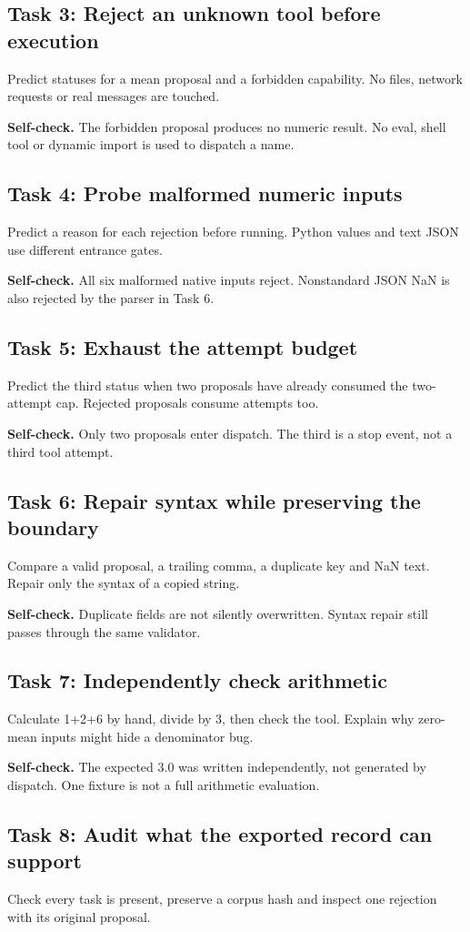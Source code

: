 \subsection{Task 3: Reject an unknown tool before execution}
Predict statuses for a mean proposal and a forbidden capability. No files, network requests or real messages are touched.

\textbf{Self-check.} The forbidden proposal produces no numeric result. No eval, shell tool or dynamic import is used to dispatch a name.
\subsection{Task 4: Probe malformed numeric inputs}
Predict a reason for each rejection before running. Python values and text JSON use different entrance gates.

\textbf{Self-check.} All six malformed native inputs reject. Nonstandard JSON NaN is also rejected by the parser in Task 6.
\subsection{Task 5: Exhaust the attempt budget}
Predict the third status when two proposals have already consumed the two-attempt cap. Rejected proposals consume attempts too.

\textbf{Self-check.} Only two proposals enter dispatch. The third is a stop event, not a third tool attempt.
\subsection{Task 6: Repair syntax while preserving the boundary}
Compare a valid proposal, a trailing comma, a duplicate key and NaN text. Repair only the syntax of a copied string.

\textbf{Self-check.} Duplicate fields are not silently overwritten. Syntax repair still passes through the same validator.
\subsection{Task 7: Independently check arithmetic}
Calculate 1+2+6 by hand, divide by 3, then check the tool. Explain why zero-mean inputs might hide a denominator bug.

\textbf{Self-check.} The expected 3.0 was written independently, not generated by dispatch. One fixture is not a full arithmetic evaluation.
\subsection{Task 8: Audit what the exported record can support}
Check every task is present, preserve a corpus hash and inspect one rejection with its original proposal.


